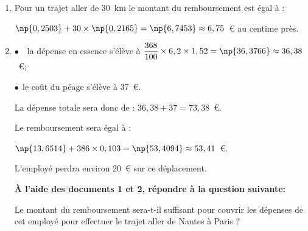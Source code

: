 \begin{enumerate}
\item %
Pour un \og trajet aller\fg{} de 30~km le montant du remboursement est égal à :

$\np{0,2503} + 30 \times \np{0,2165} = \np{6,7453} \approx 6,75$~\euro{} au centime près.
\item  %

$\bullet$~~la dépense en essence s'élève à $\dfrac{368}{100} \times 6,2 \times 1,52 = \np{36,3766} \approx 36,38$~\euro ;

$\bullet~~$le coût du péage s'élève à 37~\euro.

La dépense totale sera donc de : $36,38 + 37 = 73,38$~\euro.

Le remboursement sera égal à :

$\np{13,6514} + 386 \times 0,103 = \np{53,4094} \approx 53,41$~\euro. 

L'employé perdra environ 20~\euro{} sur ce déplacement.

\textbf{À l'aide des documents 1 et 2, répondre à la question suivante:}

\og Le montant du remboursement sera-t-il suffisant pour couvrir les dépenses de cet
employé pour effectuer le \og trajet aller\fg{} de Nantes à Paris ? \fg
\end{enumerate}

\vspace{0,5cm}

